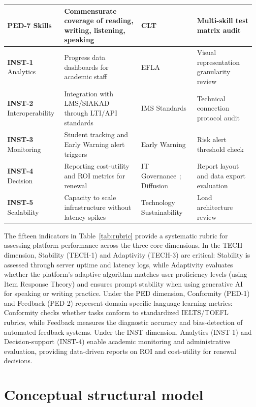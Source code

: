 \documentclass[11pt,a4paper]{article}
\begin{document}
\begin{table}[t]
\begin{tabular}{@{} L{2.0cm} L{5.4cm} L{3.1cm} L{3.1cm} @{} }
    \textbf{PED-7} Skills & Commensurate coverage of reading, writing, listening, speaking & CLT~\cite{b25} & Multi-skill test matrix audit \\
    \midrule
    \textbf{INST-1} Analytics & Progress data dashboards for academic staff & EFLA~\cite{b9} & Visual representation granularity review \\
    \textbf{INST-2} Interoperability & Integration with LMS/SIAKAD through LTI/API standards & IMS Standards~\cite{b26} & Technical connection protocol audit \\
    \textbf{INST-3} Monitoring & Student tracking and Early Warning alert triggers & Early Warning~\cite{b27} & Risk alert threshold check \\
    \textbf{INST-4} Decision & Reporting cost-utility and ROI metrics for renewal & IT Governance~\cite{b18}; Diffusion~\cite{b29} & Report layout and data export evaluation \\
    \textbf{INST-5} Scalability & Capacity to scale infrastructure without latency spikes & Technology Sustainability~\cite{b28} & Load architecture review \\
    \bottomrule
  \end{tabular}
\end{table}

The fifteen indicators in Table~\ref{tab:rubric} provide a systematic rubric for assessing platform performance across the three core dimensions. In the TECH dimension, Stability (TECH-1) and Adaptivity (TECH-3) are critical: Stability is assessed through server uptime and latency logs, while Adaptivity evaluates whether the platform's adaptive algorithm matches user proficiency levels (using Item Response Theory) and ensures prompt stability when using generative AI for speaking or writing practice. Under the PED dimension, Conformity (PED-1) and Feedback (PED-2) represent domain-specific language learning metrics: Conformity checks whether tasks conform to standardized IELTS/TOEFL rubrics, while Feedback measures the diagnostic accuracy and bias-detection of automated feedback systems. Under the INST dimension, Analytics (INST-1) and Decision-support (INST-4) enable academic monitoring and administrative evaluation, providing data-driven reports on ROI and cost-utility for renewal decisions.


\section{Conceptual structural model}
\label{sec:structural_model}
\end{document}
